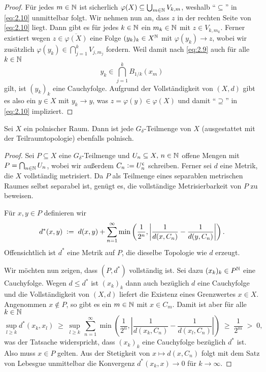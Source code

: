 \documentclass[../main/main.tex]{subfiles}
\begin{document}
\begin{proof}
		Für jedes $m \in \mathbb{N}$ ist sicherlich $\varphi(X) \subseteq 
		\bigcup_{m \in \mathbb{N}} V_{k, m}$, weshalb \enquote{$\subseteq$} 
		in \eqref{eq:2.10} unmittelbar folgt.
		Wir nehmen nun an, dass $z$ in der rechten Seite von \eqref{eq:2.10} liegt. 
		Dann gibt es für jedes $k \in \mathbb{N}$ ein $m_k \in \mathbb{N}$ mit $z \in V_{k, m_k}$. 
		Ferner existiert wegen $z \in \overline{\varphi(X)}$ eine Folge $(y_k)_k \in X^{\mathbb{N}}$ 
		mit $\varphi(y_k) \to z$, wobei wir zusätzlich
		$\varphi(y_k) \in \bigcap_{j=1}^{k} V_{j, m_j}$
		fordern. Weil damit nach \eqref{eq:2.9} auch für alle $k \in \mathbb{N}$
		\[y_k \in \bigcap_{j=1}^{k} B_{1/k}(x_m)\]
		gilt, ist $(y_k)_k$ eine Cauchyfolge. Aufgrund der Vollständigkeit von 
		$(X, d)$ gibt es also ein $y \in X$ mit $y_k \to y$, was 
		$z = \varphi(y) \in \varphi(X)$ und damit \enquote{$\supseteq$} in \eqref{eq:2.10} impliziert.
		
	\end{proof}

	\begin{Hilfssatz}
		\label{lem:characterizationpolishspaces2}
		Sei $X$ ein polnischer Raum. Dann ist jede $G_\delta$-Teilmenge 
		von $X$ (ausgestattet mit der Teilraumtopologie) ebenfalls polnisch.
	\end{Hilfssatz}

	\begin{proof}
		Sei $P \subseteq X$ eine $G_\delta$-Teilmenge und 
		$U_n \subseteq X, \, n \in \mathbb{N}$ offene Mengen mit 
		$P = \bigcap_{n \in \mathbb{N}} U_n$, wobei wir außerdem 
		$C_n \vcentcolon = U_n^{\mathsf{c}}$ schreiben. Ferner sei 
		$d$ eine Metrik, die $X$ vollständig metrisiert. 
		Da $P$ als Teilmenge eines separablen metrischen Raumes 
		selbst separabel ist, genügt es, die vollständige Metrisierbarkeit 
		von $P$ zu beweisen.
		
		Für $x, y \in P$ definieren wir
		\[d^\ast(x, y) \; \vcentcolon = \; d(x, y) + \sum_{n=1}^{\infty} \min \left(
		\frac{1}{2^n}, \left| \frac{1}{d(x, C_n)} - \frac{1}{d(y, C_n)} \right|
		\right) \text{.}\]
		Offensichtlich ist $d^\ast$ eine Metrik auf $P$, 
		die dieselbe Topologie wie $d$ erzeugt. 
		
		Wir möchten nun zeigen, dass $(P, d^\ast)$ vollständig ist. 
		Sei dazu $(x_k)_k \in P^{\mathbb{N}}$ eine Cauchyfolge. Wegen $d \leq d^\ast$ 
		ist $(x_k)_k$ dann auch bezüglich $d$ eine Cauchyfolge und die 
		Vollständigkeit von $(X, d)$ liefert die Existenz eines Grenzwertes 
		$x \in X$. Angenommen $x \notin P$, so gibt es ein $m \in \mathbb{N}$ mit 
		$x \in C_m$. Damit ist aber für alle $k \in \mathbb{N}$
		$$\sup_{l \geq k} d^\ast(x_k, x_l) \; \geq \; \sup_{l \geq k} 
			\, \sum_{n=1}^{\infty} \min \left(
			\frac{1}{2^n}, \left| \frac{1}{d(x_k, C_n)} -
			 \frac{1}{d(x_l, C_n)} \right|
			\right) \; \geq \; \frac{1}{2^m} \; > \; 0 \text{,}$$
		was der Tatsache widerspricht, dass $(x_k)_k$ eine Cauchyfolge 
		bezüglich $d^\ast$ ist. Also muss $x \in P$ gelten. 
		Aus der Stetigkeit von $x \mapsto d(x, C_n)$ folgt mit dem 
		Satz von Lebesgue unmittelbar die Konvergenz 
		$d^\ast(x_k, x) \to 0$ für $k \to \infty$.
	\end{proof}
\end{document}
